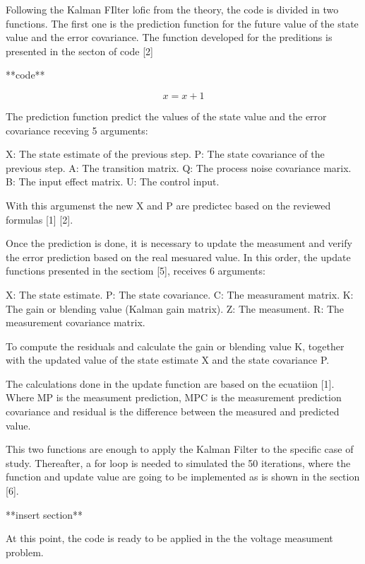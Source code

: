 \documentclass{article}
\begin{document}
    Following the Kalman FIlter lofic from the theory, the code is divided in two functions. The first one is the  prediction function for the
    future value of the state value and the error covariance. The function developed for the preditions is presented in the secton of code [2]

    **code**

    \begin{equation}
        x = x + 1
    \end{equation}

    The prediction function predict the values of the state value and the error covariance receving 5 arguments:

    X: The state estimate of the previous step.
    P: The state covariance of the previous step.
    A: The transition matrix.
    Q: The process noise covariance marix.
    B: The input effect matrix.
    U: The control input.

    With this argumenst the new X and P are predictec based on the reviewed formulas [1] [2].

    Once the prediction is done, it is necessary to update the measument and verify the error prediction based on the real mesuared value.
    In this order, the update functions presented in the sectiom [5], receives 6 arguments:

    X: The state estimate.
    P: The state covariance.
    C: The measurament matrix.
    K: The gain or blending value (Kalman gain matrix).
    Z: The measument.
    R: The measurement covariance matrix.

    To compute the residuals and calculate the gain or blending value K, together with the updated value of the state estimate X and the
    state covariance P. 

    The calculations done in the update function are based on the ecuatiion [1]. Where MP is the measument prediction, MPC is the measurement
    prediction covariance and residual is the difference between the measured and predicted value.

    \newpage

    This two functions are enough to apply the Kalman Filter to the specific case of study. Thereafter, a for loop is needed to simulated the
    50 iterations, where the function and update value are going to be implemented as is shown in the section [6].

    **insert section**

    At this point, the code is ready to be applied in the the voltage measument problem.
\end{document}
